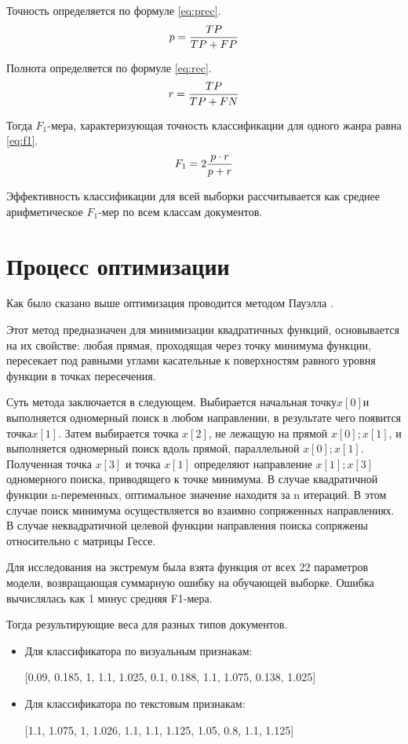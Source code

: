 Точность определяется по формуле \ref{eq:prec}.
\begin{equation}
	\centering
	p = \frac{TP}{TP+FP}
	\label{eq:prec}
\end{equation}

Полнота определяется по формуле \ref{eq:rec}.
\begin{equation}
	\centering
	r = \frac{TP}{TP+FN}
	\label{eq:rec}
\end{equation}

Тогда $F_1$-мера, характеризующая точность классификации для одного жанра равна \ref{eq:f1}.
\begin{equation}
	\centering
	F_1=2\frac{p\cdot r}{p + r}
	\label{eq:f1}
\end{equation}

Эффективность классификации для всей выборки рассчитывается как среднее арифметическое $F_1$-мер по всем классам документов.

\section{Процесс оптимизации}

Как было сказано выше оптимизация проводится методом Пауэлла \cite{paul}.

Этот метод предназначен для минимизации квадратичных функций, основывается на их свойстве: любая прямая, проходящая через точку минимума функции, пересекает под равными углами касательные к поверхностям равного уровня функции в точках пересечения. 

Суть метода заключается в следующем. Выбирается начальная точку$x [0]$и выполняется одномерный поиск в любом направлении, в результате чего появится точка$x[1]$. Затем выбирается точка $x[2]$, не лежащую на прямой $x[0];x[1]$, и выполняется одномерный поиск вдоль прямой, параллельной $x[0]; x[1]$. Полученная точка $x[3]$ и точка $x[1]$ определяют направление $x[1];x[3]$ одномерного поиска, приводящего к точке минимума. В случае квадратичной функции n-переменных, оптимальное значение находитя за n итераций. В этом случае поиск минимума осуществляется во взаимно сопряженных направлениях. В случае неквадратичной целевой функции направления поиска сопряжены относительно с матрицы Гессе.

Для исследования на экстремум была взята функция от всех 22 параметров модели, возвращающая суммарную ошибку на обучающей выборке. Ошибка вычислялась как 1 минус средняя F1-мера.

Тогда результирующие веса для разных типов документов.
\begin{itemize}
\item Для классификатора по визуальным признакам:

[0.09, 0.185, 1, 1.1, 1.025, 0.1, 0.188, 1.1, 1.075, 0.138, 1.025]

\item Для классификатора по текстовым признакам: 

[1.1, 1.075, 1, 1.026, 1.1, 1.1, 1.125, 1.05, 0.8, 1.1, 1.125]
\end{itemize}

